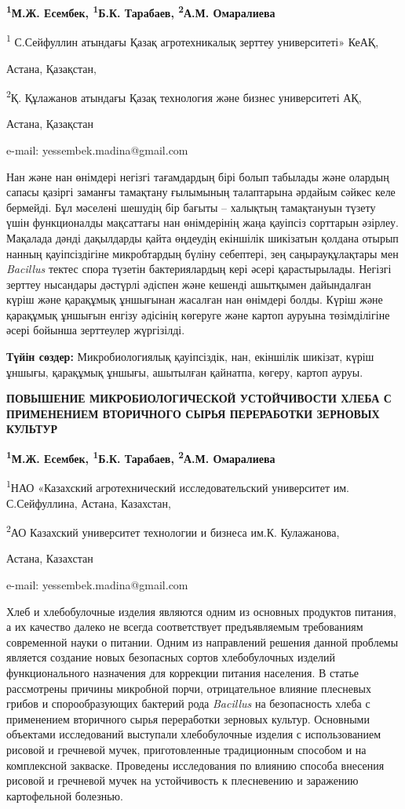 {\bfseries \textsuperscript{1}М.Ж. Есембек, \textsuperscript{1}Б.К.
Тарабаев, \textsuperscript{2}А.М. Омаралиева}

\textsuperscript{1} С.Сейфуллин атындағы Қазақ агротехникалық зерттеу
университеті» КеАҚ,

Астана, Қазақстан,

\textsuperscript{2}Қ. Құлажанов атындағы Қазақ технология және бизнес
университеті АҚ,

Астана, Қазақстан

e-mail: yessembek.madina@gmail.com

Нан және нан өнімдері негізгі тағамдардың бірі болып табылады және
олардың сапасы қазіргі заманғы тамақтану ғылымының талаптарына әрдайым
сәйкес келе бермейді. Бұл мәселені шешудің бір бағыты -- халықтың
тамақтануын түзету үшін функционалды мақсаттағы нан өнімдерінің жаңа
қауіпсіз сорттарын әзірлеу. Мақалада дәнді дақылдарды қайта өңдеудің
екіншілік шикізатын қолдана отырып нанның қауіпсіздігіне микробтардың
бүліну себептері, зең саңырауқұлақтары мен \emph{Bacillus} тектес спора
түзетін бактериялардың кері әсері қарастырылады. Негізгі зерттеу
нысандары дәстүрлі әдіспен және кешенді ашытқымен дайындалған күріш және
қарақұмық ұншығынан жасалған нан өнімдері болды. Күріш және қарақұмық
ұншығын енгізу әдісінің көгеруге және картоп ауруына төзімділігіне әсері
бойынша зерттеулер жүргізілді.

{\bfseries Түйін сөздер:} Микробиологиялық қауіпсіздік, нан, екіншілік
шикізат, күріш ұншығы, қарақұмық ұншығы, ашытылған қайнатпа, көгеру,
картоп ауруы.

{\bfseries ПОВЫШЕНИЕ МИКРОБИОЛОГИЧЕСКОЙ УСТОЙЧИВОСТИ ХЛЕБА С ПРИМЕНЕНИЕМ
ВТОРИЧНОГО СЫРЬЯ ПЕРЕРАБОТКИ ЗЕРНОВЫХ КУЛЬТУР}

{\bfseries \textsuperscript{1}М.Ж. Есембек, \textsuperscript{1}Б.К.
Тарабаев, \textsuperscript{2}А.М. Омаралиева}

\textsuperscript{1}НАО «Казахский агротехнический исследовательский
университет им. С.Сейфуллина, Астана, Казахстан,

\textsuperscript{2}АО Казахский университет технологии и бизнеса им.К.
Кулажанова,

Астана, Казахстан

e-mail: yessembek.madina@gmail.com

Хлеб и хлебобулочные изделия являются одним из основных продуктов
питания, а их качество далеко не всегда соответствует предъявляемым
требованиям современной науки о питании. Одним из направлений решения
данной проблемы является создание новых безопасных сортов хлебобулочных
изделий функционального назначения для коррекции питания населения. В
статье рассмотрены причины микробной порчи, отрицательное влияние
плесневых грибов и спорообразующих бактерий рода \emph{Bacillus} на
безопасность хлеба с применением вторичного сырья переработки зерновых
культур. Основными объектами исследований выступали хлебобулочные
изделия с использованием рисовой и гречневой мучек, приготовленные
традиционным способом и на комплексной закваске. Проведены исследования
по влиянию способа внесения рисовой и гречневой мучек на устойчивость к
плесневению и заражению картофельной болезнью.

